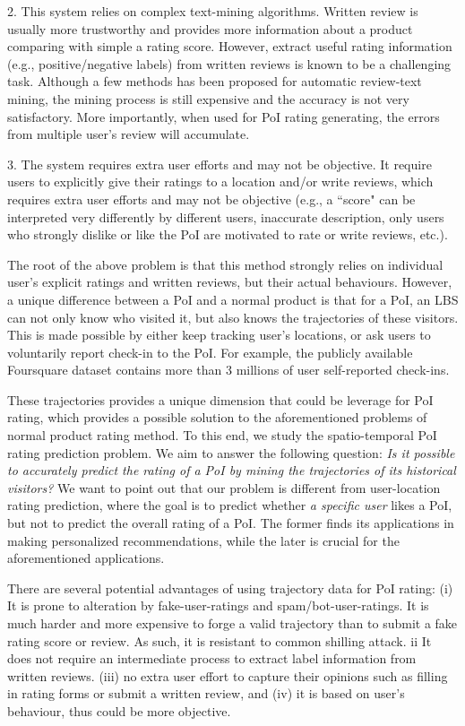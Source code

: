 2. This system relies on complex text-mining algorithms. Written review is usually more trustworthy and provides more information about a product comparing with simple a rating score. However, extract useful rating information (e.g., positive/negative labels) from written reviews is known to be a challenging task. Although a few methods has been proposed for automatic review-text mining, the mining process is still expensive and the accuracy is not very satisfactory. More importantly, when used for PoI rating generating, the errors from multiple user's review will accumulate. 

3. The system requires extra user efforts and may not be objective. It require users to explicitly give their ratings to a location and/or write reviews, which requires extra user efforts and may not be objective (e.g., a ``score" can be interpreted very differently by different users, inaccurate description, only users who strongly dislike or like the PoI are motivated to rate or write reviews, etc.). 

The root of the above problem is that this method strongly relies on individual user's explicit ratings and written reviews, but their actual behaviours. However, a unique difference between a PoI and a normal product is that for a PoI, an LBS can not only know who visited it, but also knows the trajectories of these visitors. This is made possible by either keep tracking user's locations, or ask users to voluntarily report check-in to the PoI. For example, the publicly available Foursquare dataset contains more than 3 millions of user self-reported check-ins.

These trajectories provides a unique dimension that could be leverage for PoI rating, which provides a possible solution to the aforementioned problems of normal product rating method. To this end, we study the spatio-temporal PoI rating prediction problem. We aim to answer the following question: \textit{Is it possible to accurately predict the rating of a PoI by mining the trajectories of its historical visitors?} We want to point out that our problem is different from user-location rating prediction, where the goal is to predict whether \textit{a specific user} likes a PoI, but not to predict the overall rating of a PoI. The former finds its applications in making personalized recommendations, while the later is crucial for the aforementioned applications.

There are several potential advantages of using trajectory data for PoI rating: (i) It is prone to alteration by fake-user-ratings and spam/bot-user-ratings. It is much harder and more expensive to forge a valid trajectory than to submit a fake rating score or review. As such, it is resistant to common shilling attack. {ii} It does not require an intermediate process to extract label information from written reviews. (iii) no extra user effort to capture their opinions such as filling in rating forms or submit a written review, and (iv) it is based on user's behaviour, thus could be more objective.

